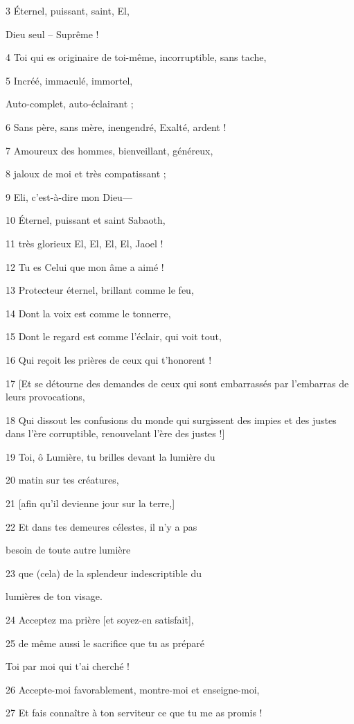 \par 3 Éternel, puissant, saint, El,
\par     Dieu seul – Suprême !
\par 4 Toi qui es originaire de toi-même, incorruptible, sans tache,
\par 5 Incréé, immaculé, immortel,
\par     Auto-complet, auto-éclairant ;
\par 6 Sans père, sans mère, inengendré, Exalté, ardent !
\par 7 Amoureux des hommes, bienveillant, généreux,
\par 8 jaloux de moi et très compatissant ;
\par 9 Eli, c'est-à-dire mon Dieu—
\par 10 Éternel, puissant et saint Sabaoth,
\par 11 très glorieux El, El, El, El, Jaoel !
\par 12 Tu es Celui que mon âme a aimé !
\par 13 Protecteur éternel, brillant comme le feu,
\par 14 Dont la voix est comme le tonnerre,
\par 15 Dont le regard est comme l'éclair, qui voit tout,
\par 16 Qui reçoit les prières de ceux qui t'honorent !
\par 17 [Et se détourne des demandes de ceux qui sont embarrassés par l'embarras de leurs provocations,
\par 18 Qui dissout les confusions du monde qui surgissent des impies et des justes dans l'ère corruptible, renouvelant l'ère des justes !]
\par 19 Toi, ô Lumière, tu brilles devant la lumière du
\par 20 matin sur tes créatures,
\par 21 [afin qu'il devienne jour sur la terre,]
\par 22 Et dans tes demeures célestes, il n'y a pas
\par     besoin de toute autre lumière
\par 23 que (cela) de la splendeur indescriptible du
\par     lumières de ton visage.
\par 24 Acceptez ma prière [et soyez-en satisfait],
\par 25 de même aussi le sacrifice que tu as préparé
\par     Toi par moi qui t'ai cherché !
\par 26 Accepte-moi favorablement, montre-moi et enseigne-moi,
\par 27 Et fais connaître à ton serviteur ce que tu me as promis !

